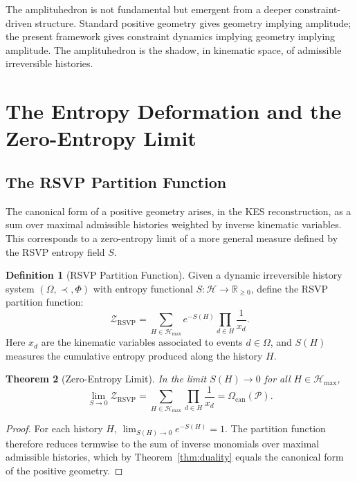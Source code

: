 \documentclass[12pt, oneside]{amsart}
\theoremstyle{plain}
\newtheorem{theorem}{Theorem}[section]
\theoremstyle{definition}
\newtheorem{definition}[theorem]{Definition}
\theoremstyle{remark}
\newcommand{\R}{\mathbb{R}}
\newcommand{\Phif}{\Phi}
\newcommand{\Sf}{S}
\newcommand{\OmKS}{\Omega}
\newcommand{\CF}{\Omega_{\mathrm{can}}}
\newcommand{\ZRSVP}{\mathcal{Z}_{\mathrm{RSVP}}}
\newcommand{\Hmax}{\mathcal{H}_{\max}}
\begin{document}
The amplituhedron is not fundamental but emergent from a deeper constraint-driven structure. Standard positive geometry gives geometry implying amplitude; the present framework gives constraint dynamics implying geometry implying amplitude. The amplituhedron is the shadow, in kinematic space, of admissible irreversible histories.

\section{The Entropy Deformation and the Zero-Entropy Limit}
\label{sec:entropy}

\subsection{The RSVP Partition Function}

The canonical form of a positive geometry arises, in the KES reconstruction, as a sum over maximal admissible histories weighted by inverse kinematic variables. This corresponds to a zero-entropy limit of a more general measure defined by the RSVP entropy field $\Sf$.

\begin{definition}[RSVP Partition Function]
Given a dynamic irreversible history system $(\OmKS, \prec, \Phif)$ with entropy functional $\Sf: \mathcal{H} \to \R_{\geq 0}$, define the RSVP partition function:
\begin{equation}
\label{eq:rsvp-partition}
  \ZRSVP = \sum_{H \in \Hmax} e^{-\Sf(H)} \prod_{d \in H} \frac{1}{x_d}.
\end{equation}
Here $x_d$ are the kinematic variables associated to events $d \in \OmKS$, and $\Sf(H)$ measures the cumulative entropy produced along the history $H$.
\end{definition}

\begin{theorem}[Zero-Entropy Limit]
\label{thm:zero-entropy}
In the limit $\Sf(H) \to 0$ for all $H \in \Hmax$,
\[
  \lim_{\Sf \to 0} \ZRSVP = \sum_{H \in \Hmax} \prod_{d \in H} \frac{1}{x_d} = \CF(\mathcal{P}).
\]
\end{theorem}

\begin{proof}
For each history $H$, $\lim_{\Sf(H) \to 0} e^{-\Sf(H)} = 1$. The partition function therefore reduces termwise to the sum of inverse monomials over maximal admissible histories, which by Theorem~\ref{thm:duality} equals the canonical form of the positive geometry.
\end{proof}
\end{document}

